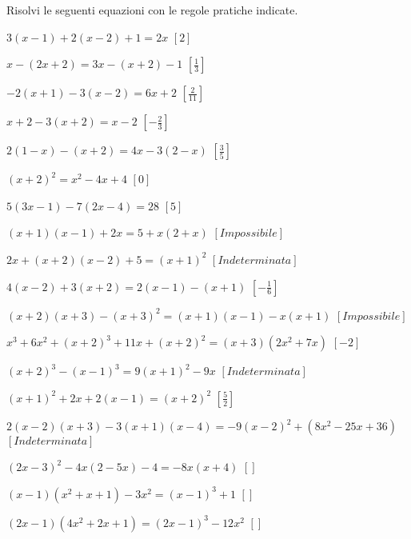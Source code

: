 \begin{esercizio}[\Ast]
\label{ese:13.14}
Risolvi le seguenti equazioni con le regole pratiche indicate.
 \begin{enumeratea}
 \item $3(x-1)+2(x-2)+1=2x$ \hfill $\left[2\right]$
 \item $x-(2x+2)=3x-(x+2)-1$ \hfill $\left[\frac{1}{3}\right]$
 \item $-2(x+1)-3(x-2)=6x+2$ \hfill $\left[\frac{2}{11}\right]$
 \item $x+2-3(x+2)=x-2$ \hfill $\left[-\frac{2}{3}\right]$
 \item $2(1-x)-(x+2)=4x-3(2-x)$ \hfill $\left[\frac{3}{5}\right]$
 \item $(x+2)^{2}=x^{2}-4x+4$ \hfill $\left[0\right]$
 \item $5(3x-1)-7(2x-4)=28$ \hfill $\left[5\right]$
 \item $(x+1)(x-1)+2x=5+x(2+x)$ \hfill $\left[Impossibile\right]$
 \item $2x+(x+2)(x-2)+5=(x+1)^{2}$ \hfill $\left[Indeterminata\right]$
 \item $4(x-2)+3(x+2)=2(x-1)-(x+1)$ \hfill $\left[-\frac{1}{6}\right]$
 \item $(x+2)(x+3)-(x+3)^{2}=(x+1)(x-1)-x(x+1)$ 
  \hfill $\left[Impossibile\right]$
 \item $x^{3}+6x^{2}+(x+2)^{3}+11x+(x+2)^{2}=(x+3)\left(2x^{2}+7x\right)$ 
  \hfill $\left[-2\right]$
 \item $(x+2)^{3}-(x-1)^{3}=9(x+1)^{2}-9x$ \hfill $\left[Indeterminata\right]$
 \item $(x+1)^{2}+2x+2(x-1)=(x+2)^{2}$ \hfill $\left[\frac{5}{2}\right]$
 \item $2(x-2)(x+3)-3(x+1)(x-4)=-9(x-2)^{2}+\left(8x^{2}-25x+36\right)$ 
  \hfill $\left[Indeterminata\right]$
 \item $(2x-3)^{2}-4x(2-5x)-4=-8x(x+4)$ \hfill $\left[\right]$
 \item $(x-1)\left(x^{2}+x+1\right)-3x^{2}=(x-1)^{3}+1$ \hfill $\left[\right]$
 \item $(2x-1)\left(4x^{2}+2x+1\right)=(2x-1)^{3}-12x^{2}$ 
  \hfill $\left[\right]$
 \end{enumeratea}
\end{esercizio}


